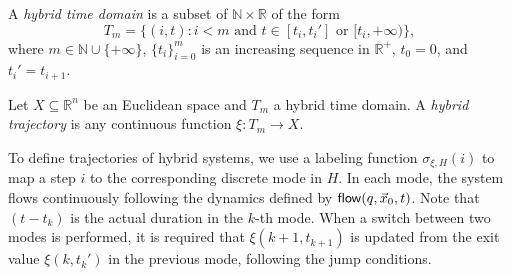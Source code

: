 \documentclass[12pt]{article}
\begin{document}
\begin{definition}
A {\em hybrid time domain} is a subset of
 $\mathbb{N}\times \mathbb{R}$ of the form
$$T_m=\{(i, t): i<m \mbox{ and } t\in [t_i, t_i']\mbox{ or }[t_i, +\infty)\},$$
where $m\in \mathbb{N}\cup\{+\infty\}$, $\{t_i\}_{i=0}^m$ is an
increasing sequence in $\mathbb{R}^+$, $t_0= 0$, and $t_i'=t_{i+1}$.
\end{definition}
\begin{definition}
Let $X\subseteq\mathbb{R}^n$ be an Euclidean space and $T_m$ a hybrid
time domain. A {\em hybrid trajectory} is any continuous function $\xi: T_m
\rightarrow X.$
 \end{definition}
To define trajectories of hybrid systems, we use a labeling function $\sigma_{\xi,H}(i)$ to map a step $i$ to the corresponding discrete mode in $H$. In each mode, the system flows continuously following the dynamics defined by $\mathsf{flow}(q, \vec x_0, t)$. Note that $(t-t_k)$ is the actual duration in the $k$-th mode. When a switch between two modes is performed, it is required that $\xi(k+1, t_{k+1})$ is updated from the exit value $\xi(k, t_k')$ in the previous mode, following the jump conditions.
\end{document}
